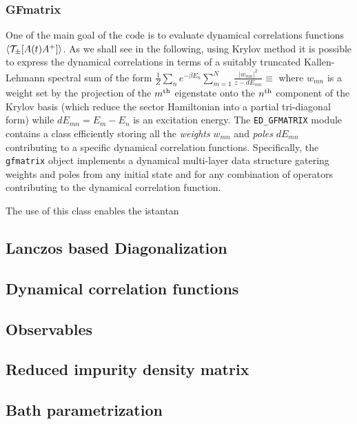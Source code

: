 \documentclass[final,3p,10pt]{elsarticle}
\def\TT{{\cal T}}\def\NN{{\cal N}}\def\BB{{\cal B}} \def\II{{\cal I}}
\def\ibra{\langle}
\def\iket{\rangle}
\begin{document}
\subsubsection{GFmatrix}
One of the main goal of the code is to evaluate dynamical correlations
functions $\ibra \TT_\pm[ A(t)
A^+ ]\iket$. As we shall see in the following, using Krylov method it is
possible to express the dynamical correlations in terms of a suitably
truncated Kallen-Lehmann spectral sum of the form
$\tfrac{1}{Z}\sum_n e^{-\beta E_n} \sum_{m=1}^{N} \tfrac{|w_{mn}|^2}{ z
  - dE_{mn}}\equiv $ where $w_{mn}$ is a weight set by the 
projection of the $m^{\rm th}$ eigenstate onto the $n^{\rm th}$
component of the Krylov basis (which reduce the sector Hamiltonian
into a partial tri-diagonal form) while $dE_{mn}=E_m-E_n$ is an excitation energy. 
The {\tt ED\_GFMATRIX} module contains a class efficiently storing all
the {\it weights} $w_{mn}$ and {\it poles} $dE_{mn}$ contributing to
a specific dynamical correlation functions. Specifically, the {\tt
  gfmatrix} object implements a dynamical multi-layer data structure
gatering weights and poles from any initial state and for any
combination of operators contributing to the dynamical correlation
function.

The use of this class enables the istantan

  
  
  \subsection{Lanczos based Diagonalization}\label{sSecHam}

  

\subsection{Dynamical correlation functions}\label{sSecGF}

\subsection{Observables}\label{sSecObc}

\subsection{Reduced impurity density matrix}\label{sSecRDM}

\subsection{Bath parametrization}\label{sSecBath}
\end{document}
